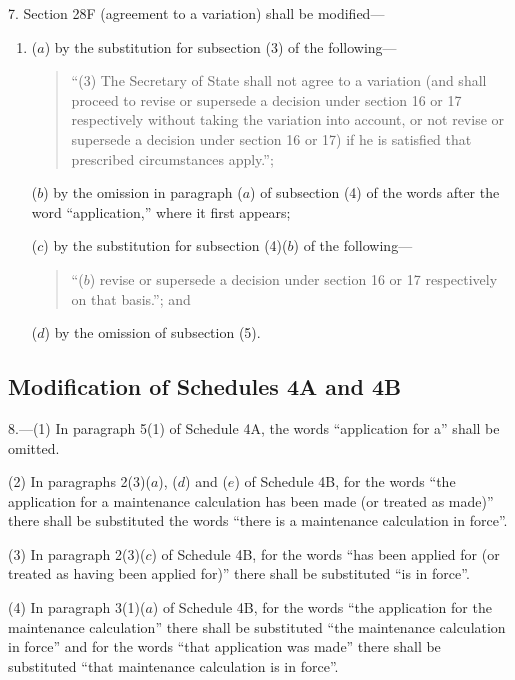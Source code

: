 \documentclass[12pt,a4paper]{article}
\begin{document}
7.  Section 28F (agreement to a variation) shall be modified—
\begin{enumerate}\item[]
($a$) by the substitution for subsection (3) of the following—
\begin{quotation}
“(3) The Secretary of State shall not agree to a variation (and shall proceed to revise or supersede a decision under section 16 or 17 respectively without taking the variation into account, or not revise or supersede a decision under section 16 or 17) if he is satisfied that prescribed circumstances apply.”;
\end{quotation}

($b$) by the omission in paragraph ($a$)  of subsection (4) of the words after the word “application,” where it first appears;

($c$) by the substitution for subsection (4)($b$)  of the following—
\begin{quotation}
“($b$) revise or supersede a decision under section 16 or 17 respectively on that basis.”; and
\end{quotation}

($d$) by the omission of subsection (5).
\end{enumerate}

\subsection[8. Modification of Schedules 4A and 4B]{Modification of Schedules 4A and 4B}

8.---(1)  In paragraph 5(1) of Schedule 4A, the words 
“application for a”  %
shall be omitted.

(2) In paragraphs 2(3)($a$), ($d$)  and ($e$)  of Schedule 4B, for the words “the application for a maintenance calculation has been made (or treated as made)” there shall be substituted the words “there is a maintenance calculation in force”.

(3) In paragraph 2(3)($c$)  of Schedule 4B, for the words “has been applied for (or treated as having been applied for)” there shall be substituted “is in force”.

(4) In paragraph 3(1)($a$)  of Schedule 4B, for the words “the application for the maintenance calculation” there shall be substituted “the maintenance calculation in force” and for the words “that application was made” there shall be substituted “that maintenance calculation is in force”.
\end{document}
